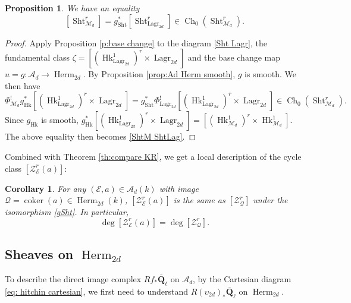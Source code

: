 \documentclass[reqno]{amsart}
\numberwithin{equation}{section}
\newcommand{\Q}{\mathbf{Q}}
\newcommand{\co}{\colon}
\DeclareMathOperator{\coker}{coker}
\DeclareMathOperator{\Sht}{Sht}
\DeclareMathOperator{\Hk}{Hk}
\DeclareMathOperator{\Ch}{Ch}
\DeclareMathOperator{\Herm}{Herm}
\DeclareMathOperator{\Lagr}{Lagr}
\newcommand{\Qlbar}{\overline{\Q}_\ell}
\newcommand{\z}{\zeta}
\newcommand\cA{\mathcal{A}}
\newcommand\cE{\mathcal{E}}
\newcommand\cM{\mathcal{M}}
\newcommand\cQ{\mathcal{Q}}
\newcommand\cZ{\mathcal{Z}}
\newtheorem{prop}[thm]{Proposition}
\newtheorem{cor}[thm]{Corollary}
\theoremstyle{remark}
\numberwithin{equation}{section}
\begin{document}
\begin{prop} We have an equality
\begin{equation}\label{ShtM ShtLag}
[\Sht^{r}_{\cM_{d}}]=g_{\Sht}^{*}[\Sht^{r}_{\Lagr_{2d}}]\in \Ch_{0}(\Sht^{r}_{\cM_{d}}).
\end{equation}
\end{prop} 
\begin{proof}
Apply Proposition \ref{p:base change} to the diagram \eqref{Sht Lagr}, the fundamental class $\z=[(\Hk^{1}_{\Lagr_{2d}})^{r} \times \Lagr_{2d}]$ and the base change map $u=g: \cA_{d}\to \Herm_{2d}$. By Proposition \ref{prop:Ad Herm smooth}, $g$ is smooth. We then have
\begin{equation}
\Phi_{\cM_{d}}^{!}g_{\Hk}^{*}[(\Hk^{1}_{\Lagr_{2d}})^{r} \times \Lagr_{2d}]=g^{*}_{\Sht}\Phi_{\Lagr_{2d}}^{!}[(\Hk^{1}_{\Lagr_{2d}})^{r} \times \Lagr_{2d}]\in \Ch_{0}(\Sht^{r}_{\cM_{d}}).
\end{equation}
Since $g_{\Hk}$ is smooth,  $g_{\Hk}^{*}[(\Hk^{1}_{\Lagr_{2d}})^{r} \times \Lagr_{2d}]=[(\Hk^{1}_{\cM_{d}})^{r} \times \Hk^{1}_{\cM_{d}}]$. The above equality then becomes \eqref{ShtM ShtLag}.
\end{proof}


Combined with Theorem \ref{th:compare KR}, we get a local description of the cycle class $[\cZ^{r}_{\cE}(a)]$:
\begin{cor}\label{c:Zloc}For any $(\cE,a)\in \cA_{d}(k)$ with image $\cQ=\coker(a)\in \Herm_{2d}(k)$, $[\cZ^{r}_{\cE}(a)]$ is the same as $[\cZ^{r}_{\cQ}]$ under the isomorphism \eqref{gSht}. In particular,
\begin{equation}
\deg[\cZ^{r}_{\cE}(a)]=\deg[\cZ^{r}_{\cQ}].
\end{equation}
\end{cor}



\subsection{Sheaves on $\Herm_{2d}$}
To describe the direct image complex $Rf_{*}\Qlbar$ on $\cA_{d}$, by the Cartesian diagram \eqref{eq: hitchin cartesian}, we first need to understand $R(\upsilon_{2d})_*\Qlbar$ on $\Herm_{2d}$.
\end{document}
